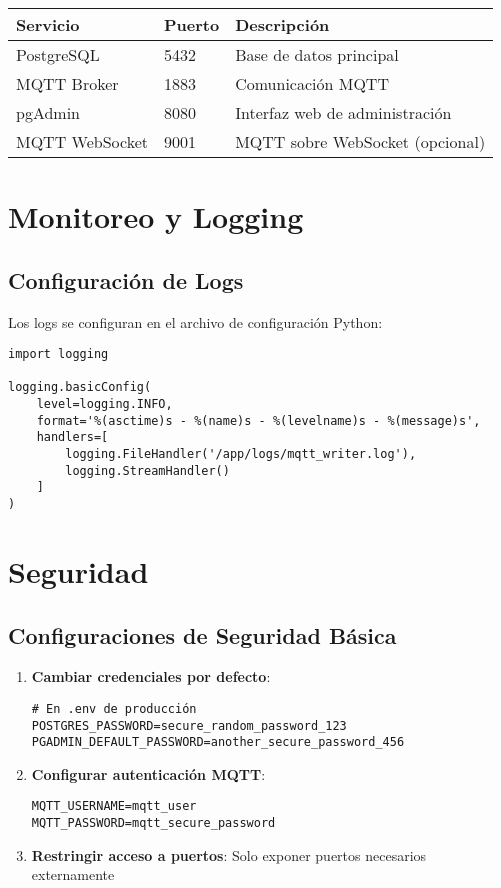 \begin{table}[H]
\centering
\begin{tabular}{|l|l|l|}
\hline
\textbf{Servicio} & \textbf{Puerto} & \textbf{Descripción} \\
\hline
PostgreSQL & 5432 & Base de datos principal \\
\hline
MQTT Broker & 1883 & Comunicación MQTT \\
\hline
pgAdmin & 8080 & Interfaz web de administración \\
\hline
MQTT WebSocket & 9001 & MQTT sobre WebSocket (opcional) \\
\hline
\end{tabular}
\end{table}

\section{Monitoreo y Logging}

\subsection{Configuración de Logs}

Los logs se configuran en el archivo de configuración Python:

\begin{verbatim}
import logging

logging.basicConfig(
    level=logging.INFO,
    format='%(asctime)s - %(name)s - %(levelname)s - %(message)s',
    handlers=[
        logging.FileHandler('/app/logs/mqtt_writer.log'),
        logging.StreamHandler()
    ]
)
\end{verbatim}

\section{Seguridad}

\subsection{Configuraciones de Seguridad Básica}

\begin{enumerate}[noitemsep]
    \item \textbf{Cambiar credenciales por defecto}:
    \begin{verbatim}
# En .env de producción
POSTGRES_PASSWORD=secure_random_password_123
PGADMIN_DEFAULT_PASSWORD=another_secure_password_456
    \end{verbatim}
    
    \item \textbf{Configurar autenticación MQTT}:
    \begin{verbatim}
MQTT_USERNAME=mqtt_user
MQTT_PASSWORD=mqtt_secure_password
    \end{verbatim}
    
    \item \textbf{Restringir acceso a puertos}:
    Solo exponer puertos necesarios externamente
\end{enumerate}

